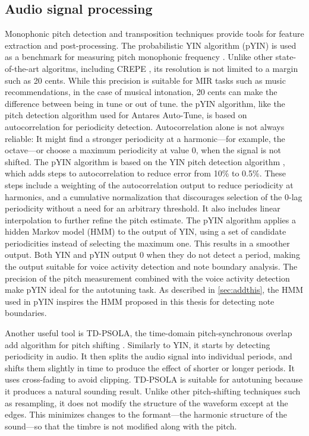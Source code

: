 \subsection{Audio signal processing}
Monophonic pitch detection and transposition techniques provide tools for feature extraction and post-processing. The probabilistic YIN algorithm (pYIN) \cite{mauch2014pyin} is used as a benchmark for measuring pitch monophonic frequency \cite{devaney2020new}. Unlike other state-of-the-art algoritms, including CREPE \cite{kim2018crepe}, its resolution is not limited to a margin such as 20 cents. While this precision is suitable for MIR tasks such as music recommendations, in the case of musical intonation, 20 cents can make the difference between being in tune or out of tune. the pYIN algorithm, like the pitch detection algorithm used for Antares Auto-Tune, is based on autocorrelation for periodicity detection. Autocorrelation alone is not always reliable: It might find a stronger periodicity at a harmonic---for example, the octave---or choose a maximum periodicity at value 0, when the signal is not shifted. The pYIN algorithm is based on the YIN pitch detection algorithm \cite{de2002yin}, which adds steps to autocorrelation to reduce error from 10\% to 0.5\%. These steps include a weighting of the autocorrelation output to reduce periodicity at harmonics, and a cumulative normalization that discourages selection of the 0-lag periodicity without a need for an arbitrary threshold. It also includes linear interpolation to further refine the pitch estimate. The pYIN algorithm applies a hidden Markov model (HMM) to the output of YIN, using a set of candidate periodicities instead of selecting the maximum one. This results in a smoother output. Both YIN and pYIN output 0 when they do not detect a period, making the output suitable for voice activity detection and note boundary analysis. The precision of the pitch measurement combined with the voice activity detection make pYIN ideal for the autotuning task. As described in \ref{sec:addthis}, the HMM used in pYIN inspires the HMM proposed in this thesis for detecting note boundaries. 

Another useful tool is TD-PSOLA, the time-domain pitch-synchronous overlap add algorithm for pitch shifting \cite{charpentier1986diphone}. Similarly to YIN, it starts by detecting periodicity in audio. It then splits the audio signal into individual periods, and shifts them slightly in time to produce the effect of shorter or longer periods. It uses cross-fading to avoid clipping. TD-PSOLA is suitable for autotuning because it produces a natural sounding result. Unlike other pitch-shifting techniques such as resampling, it does not modify the structure of the waveform except at the edges. This minimizes changes to the formant---the harmonic structure of the sound---so that the timbre is not modified along with the pitch. 

